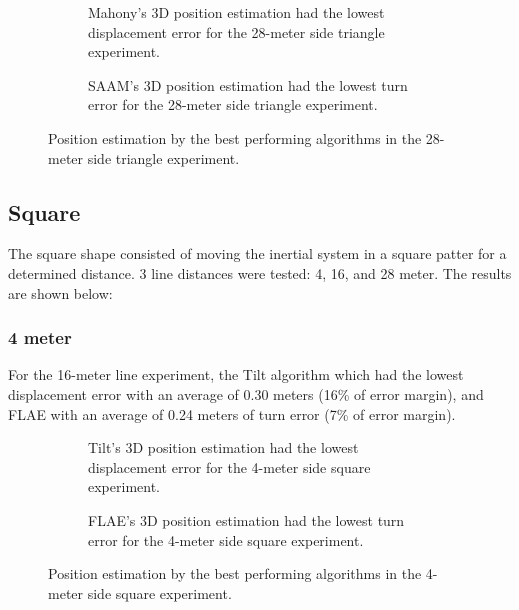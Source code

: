 \begin{figure}[!h]
    \centering
    \begin{subfigure}{0.49\textwidth}
        \centering
        \resizebox{1\linewidth}{!}{}
        \caption{Mahony's 3D position estimation had the lowest displacement error for the 28-meter side triangle experiment.}
        \label{fig:triangle28_2D}
    \end{subfigure}
    \begin{subfigure}{0.49\textwidth}
        \centering
        \resizebox{1\linewidth}{!}{}
        \caption{SAAM's 3D position estimation had the lowest turn error for the 28-meter side triangle experiment.}
        \label{fig:triangle28_3D}
    \end{subfigure}
    \caption{Position estimation by the best performing algorithms in the 28-meter side triangle experiment.}
    \label{fig:triangle28}
\end{figure}

\subsection{Square}

The square shape consisted of moving the inertial system in a square patter for a determined distance. 3 line distances were tested: 4, 16, and 28 meter. The results are shown below:

\subsubsection{4 meter}

For the 16-meter line experiment, the Tilt algorithm which had the lowest displacement error with an average of 0.30 meters (16\% of error margin), and FLAE with an average of 0.24 meters of turn error (7\% of error margin).


\begin{figure}[!h]
    \centering
    
\end{figure}

\begin{figure}[!h]
    \centering
    \begin{subfigure}{0.49\textwidth}
        \centering
        \resizebox{1\linewidth}{!}{}
        \caption{Tilt's 3D position estimation had the lowest displacement error for the 4-meter side square experiment.}

        \label{fig:square42D}
    \end{subfigure}
    \begin{subfigure}{0.49\textwidth}
        \centering
        \resizebox{1\linewidth}{!}{}
        \caption{FLAE's 3D position estimation had the lowest turn error for the 4-meter  side square experiment.}
        \label{fig:square43D}
    \end{subfigure}
    \caption{Position estimation by the best performing algorithms in the 4-meter side square experiment.}
    \label{fig:square4}
\end{figure}

